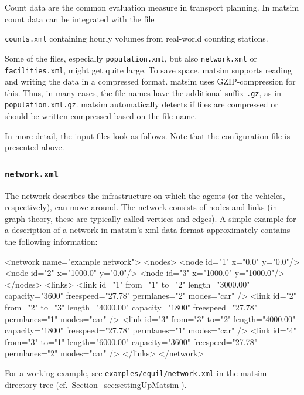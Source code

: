 Count data are the common evaluation measure in transport planning. In \gls{matsim} count data can be integrated with the file
\begin{compactitem}
\item \lstinline|counts.xml| containing hourly volumes from real-world counting stations.
\end{compactitem}

Some of the files, especially \lstinline|population.xml|, but also \lstinline|network.xml| or \lstinline|facilities.xml|, might get quite large. To save space, \gls{matsim} supports reading and writing the data in a compressed format. \gls{matsim} uses GZIP-compression for this. Thus, in many cases, the file names have the additional suffix \lstinline|.gz|, as in \lstinline|population.xml.gz|. \gls{matsim} automatically detects if files are compressed or should be written compressed based on the file name. 

In more detail, the input files look as follows. Note that the configuration file is presented above.

\subsubsection{\lstinline|network.xml|}
\label{sec:lgstartednetwork}
The network describes the infrastructure on which the agents (or the vehicles, respectively), can move around. The network consists of \glspl{node} and \glspl{link} (in graph theory, these are typically called vertices and edges). A simple example for a description of a network in \gls{matsim}'s \gls{xml} data format 
approximately contains the following information:
\begin{xml}
<network name="example network"> 
   <nodes> 
      <node id="1" x="0.0" y="0.0"/> 
      <node id="2" x="1000.0" y="0.0"/> 
      <node id="3" x="1000.0" y="1000.0"/> 
   </nodes> 
   <links> 
      <link id="1" from="1" to="2" length="3000.00" capacity="3600" 
            freespeed="27.78" permlanes="2" modes="car" /> 
      <link id="2" from="2" to="3" length="4000.00" capacity="1800" 
            freespeed="27.78" permlanes="1" modes="car" /> 
      <link id="3" from="3" to="2" length="4000.00" capacity="1800" 
            freespeed="27.78" permlanes="1" modes="car" /> 
      <link id="4" from="3" to="1" length="6000.00" capacity="3600" 
            freespeed="27.78" permlanes="2" modes="car" /> 
   </links> 
</network>
\end{xml}
For a working example, see \lstinline{examples/equil/network.xml} in the \gls{matsim} directory tree (cf.\ Section~\ref{sec:settingUpMatsim}).

